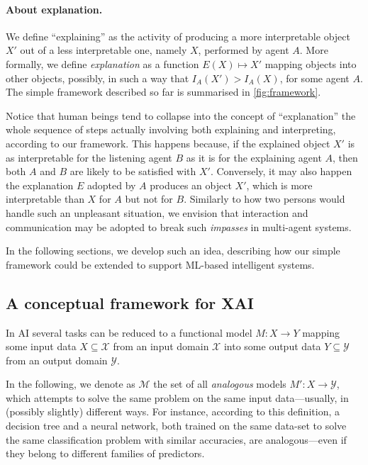 \documentclass[12pt,a4paper,openright,twoside]{book}
\begin{document}
\paragraph{About explanation.}
We define ``explaining'' as the activity of producing a more interpretable object $X'$ out of a less interpretable one, namely $X$, performed by agent $A$.
%
More formally, we define \emph{explanation} as a function $E(X) \mapsto X'$ mapping objects into other objects, possibly, in such a way that $I_A(X') > I_A(X)$, for some agent $A$.
%
The simple framework described so far is summarised in \cref{fig:framework}.

Notice that human beings tend to collapse into the concept of ``explanation'' the whole sequence of steps actually involving both explaining and interpreting, according to our framework.
%
This happens because, if the explained object $X'$ is as interpretable for the listening agent $B$ as it is for the explaining agent $A$, then both $A$ and $B$ are likely to be satisfied with $X'$.
%
Conversely, it may also happen the explanation $E$ adopted by $A$ produces an object $X'$, which is more interpretable than $X$ for $A$ but not for $B$.
%
Similarly to how two persons would handle such an unpleasant situation, we envision that interaction and communication may be adopted to break such \emph{impasses} in multi-agent systems.

In the following sections, we develop such an idea, describing how our simple framework could be extended to support ML-based intelligent systems.

\subsection{A conceptual framework for XAI}\label{ssec:framework}

In AI several tasks can be reduced to a functional model $M: X \rightarrow Y$ mapping some input data $X \subseteq \mathcal{X}$ from an input domain $\mathcal{X}$ into some output data $Y \subseteq \mathcal{Y}$ from an output domain $\mathcal{Y}$.

In the following, we denote as $\mathcal{M}$  the set of all \emph{analogous} models $M': X \rightarrow \mathcal{Y}$, which attempts to solve the same problem on the same input data---usually, in (possibly slightly) different ways.
%
For instance, according to this definition, a decision tree and a neural network, both trained on the same data-set to solve the same classification problem with similar accuracies, are analogous---even if they belong to different families of predictors.
\end{document}
